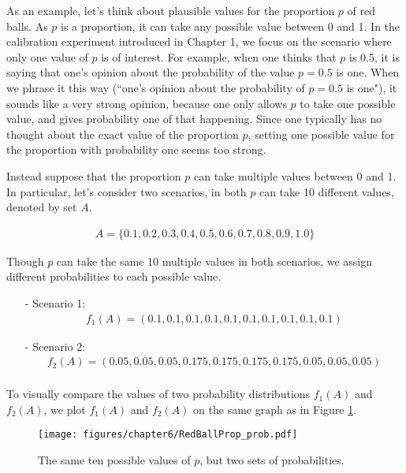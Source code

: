 \documentclass[]{book}
\begin{document}
As an example, let's think about plausible values for the proportion \(p\) of red balls. As \(p\) is a proportion, it can take any possible value between 0 and 1. In the calibration experiment introduced in Chapter 1, we focus on the scenario where only one value of \(p\) is of interest. For example, when one thinks that \(p\) is 0.5, it is saying that one's opinion about the probability of the value \(p=0.5\) is one. When we phrase it this way (``one's opinion about the probability of \(p=0.5\) is one"), it sounds like a very strong opinion, because one only allows \(p\) to take one possible value, and gives probability one of that happening. Since one typically has no thought about the exact value of the proportion \(p\), setting one possible value for the proportion with probability one seems too strong.

Instead suppose that the proportion \(p\) can take multiple values between 0 and 1. In particular, let's consider two scenarios, in both \(p\) can take 10 different values, denoted by set \(A\).

\begin{eqnarray}
A = \{0.1, 0.2, 0.3, 0.4, 0.5, 0.6, 0.7, 0.8, 0.9, 1.0\}
\end{eqnarray}

Though \(p\) can take the same 10 multiple values in both scenarios, we assign different probabilities to each possible value.

\begin{enumerate}
\item[-] Scenario 1: 
\begin{eqnarray}
f_1(A) = (0.1, 0.1, 0.1, 0.1, 0.1, 0.1, 0.1, 0.1, 0.1, 0.1)
\end{eqnarray}
\item[-] Scenario 2: 
\begin{eqnarray}
f_2(A) = (0.05, 0.05, 0.05, 0.175, 0.175, 0.175, 0.175, 0.05, 0.05, 0.05) \nonumber \\
\end{eqnarray}
\end{enumerate}

To visually compare the values of two probability distributions \(f_1(A)\) and \(f_2(A)\), we plot \(f_1(A)\) and \(f_2(A)\) on the same graph as in Figure \ref{fig:RedBallProp_prob}.

\begin{figure}[htb]
\begin{center}
\texttt{[image: figures/chapter6/RedBallProp\_prob.pdf]}
\caption{\label{fig:RedBallProp_prob} The same ten possible values of $p$, but two sets of probabilities.}
\end{center}
\end{figure}
\end{document}

